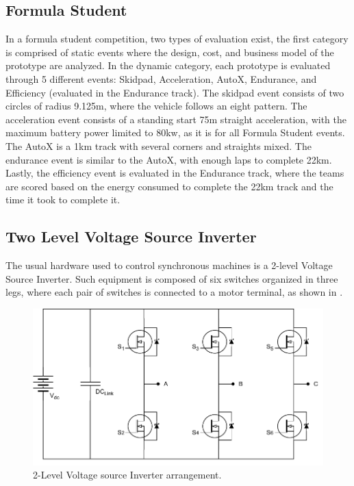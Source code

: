 \documentclass[9pt,conference]{IEEEtran}
\begin{document}
\subsection{Formula Student}
In a formula student competition, two types of evaluation exist, the first category is comprised of static events where the design, cost, and business model of the prototype are analyzed. In the dynamic category, each prototype is evaluated through 5 different events: Skidpad, Acceleration, AutoX, Endurance, and Efficiency (evaluated in the Endurance track).  The skidpad event consists of two circles of radius 9.125m, where the vehicle follows an eight pattern. The acceleration event consists of a standing start 75m straight acceleration, with the maximum battery power limited to 80kw, as it is for all Formula Student events. The AutoX is a 1km track with several corners and straights mixed. The endurance event is similar to the AutoX, with enough laps to complete 22km. Lastly, the efficiency event is evaluated in the Endurance track, where the teams are scored based on the energy consumed to complete the 22km track and the time it took to complete it.

\subsection{Two Level Voltage Source Inverter}

The usual hardware used to control synchronous machines is a 2-level Voltage Source Inverter. Such equipment is composed of six switches organized in three legs, where each pair of switches is connected to a motor terminal, as shown in .

\begin{figure}[!htb]
	\centering
	\includegraphics[width=0.9\linewidth]{Figures/Inverter.pdf}
	\caption[2-Level Voltage source Inverter arrangement.]{2-Level Voltage source Inverter arrangement.}
	\label{fig:inverter_and_motor_schematic}%
\end{figure}
\end{document}
